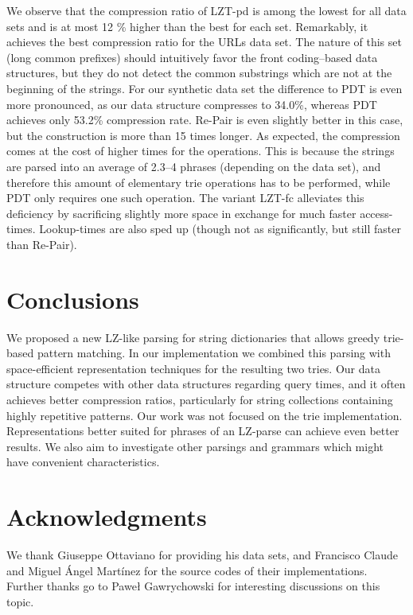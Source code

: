 \documentclass{llncs}
\begin{document}
We observe that the compression ratio of LZT-pd is among the lowest for all data sets and is at most 12 \% higher than the best for each set. Remarkably, it achieves the best compression ratio for the URLs data set.
The nature of this set (long common prefixes) should intuitively favor the front coding--based data structures, but they do not detect the common substrings which are not at the beginning of the strings.
For our synthetic data set the difference to PDT is even more pronounced, as our data structure compresses to 34.0\%, whereas PDT achieves only 53.2\% compression rate. Re-Pair is even slightly better in this case, but the construction is more than 15 times longer.
As expected, the compression comes at the cost of higher times for the operations. This is because the strings are parsed into an average of 2.3--4 phrases (depending on the data set), and therefore this amount of elementary trie operations has to be performed, while PDT only requires one such operation.
The variant LZT-fc alleviates this deficiency by sacrificing slightly more space in exchange for much faster access-times. Lookup-times are also sped up (though not as significantly, but still faster than Re-Pair).

\section{Conclusions}
We proposed a new LZ-like parsing for string dictionaries that allows greedy trie-based pattern matching. In our implementation we combined this parsing with space-efficient representation techniques for the resulting two tries.
Our data structure competes with other data structures regarding query times, and it often achieves better compression ratios, particularly for string collections containing highly repetitive patterns. 
Our work was not focused on the trie implementation. Representations better suited for phrases of an LZ-parse can achieve even better results. We also aim to investigate other parsings and grammars which might have convenient characteristics.

\section*{Acknowledgments}
We thank Giuseppe Ottaviano for providing his data sets, and Francisco Claude and Miguel \'Angel Mart\'inez for the source codes of their implementations. Further thanks go to Pawe\l{} Gawrychowski for interesting discussions on this topic.
\end{document}
